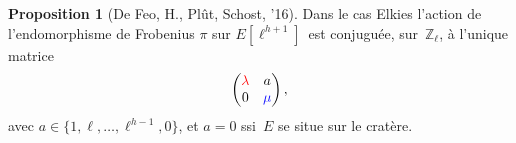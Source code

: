 \documentclass[10pt,a4paper]{beamer}
\theoremstyle{plain}
\theoremstyle{definition}
\theoremstyle{definition}
\theoremstyle{definition}
\newtheorem{prop}[thm]{Proposition}
\theoremstyle{definition}
\theoremstyle{remark}
\theoremstyle{remark}
\theoremstyle{definition}
\begin{document}
\begin{frame}

\begin{prop}[De Feo, H., Pl\^ut, Schost, '16]\label{prop:matrice-Frobenius}
Dans le cas Elkies l'action de l'endomorphisme de Frobenius $\pi$ sur 
$E[\ell^{h+1}]$~est conjuguée, sur~$\mathbb{Z}_{\ell}$, à l'unique matrice
 \[\left ( \begin{matrix}{\color{red}\lambda} & a\\ 0 &
{\color{blue}\mu} \end{matrix}\right ), \]  avec $a \in \{ 1,\ell, \dots,
\ell^{h-1}, 0  \}$, et $a = 0$ ssi~$E$ se situe sur le cratère.

\end{prop}

\begin{figure}
\begin{center}


\end{center}
\end{figure}
\end{frame}
\end{document}
